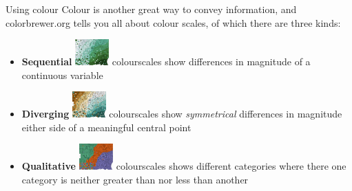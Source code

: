 \documentclass[
  10pt,
  ignorenonframetext,
  aspectratio=169]{beamer}
\begin{document}
\begin{frame}{Using colour}
\protect\hypertarget{using-colour}{}
Colour is another great way to convey information, and colorbrewer.org
tells you all about colour scales, of which there are three kinds:

\begin{itemize}
  \item<2->\textbf{Sequential} \includegraphics[height=1cm]{images/seq.png} colourscales show differences in magnitude of a continuous variable 
  \item<3->\textbf{Diverging} \includegraphics[height=1cm]{images/div.png} colourscales show \textit{symmetrical} differences in magnitude either side of a meaningful central point 
  \item<4->\textbf{Qualitative} \includegraphics[height=1cm]{images/qual.png} colourscales shows different categories where there one category is neither greater than nor less than another 
\end{itemize}

\end{frame}
\end{document}
